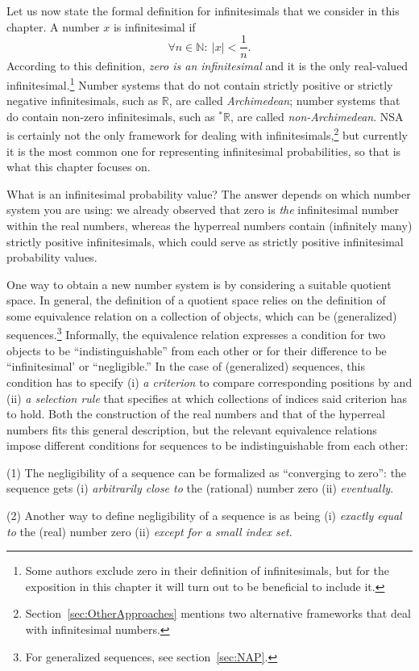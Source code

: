 Let us now state the formal definition for infinitesimals that we consider in this chapter. A number $x$ is infinitesimal if
\begin{equation}
\forall n \in \mathbb{N} : \ |x| < \frac{1}{n}.\label{eq:inf}
\end{equation}
According to this definition, \emph{zero is an infinitesimal} and it is the only real-valued infinitesimal.\footnote{Some authors exclude zero in their definition of infinitesimals, but for the exposition in this chapter it will turn out to be beneficial to include it.}
Number systems that do not contain strictly positive or strictly negative infinitesimals, such as $\mathbb{R}$, are called \emph{Archimedean}; number systems that do contain non-zero infinitesimals, such as ${^*} \mathbb{R}$, are called \emph{non-Archimedean}. NSA is certainly not the only framework for dealing with infinitesimals,\footnote{Section~\ref{sec:OtherApproaches} mentions two alternative frameworks that deal with infinitesimal numbers.} but currently it is the most common one for representing infinitesimal probabilities, so that is what this chapter focuses on.

What is an infinitesimal probability value? The answer depends on which number system you are using: we already observed that zero is \emph{the} infinitesimal number within the real numbers, whereas the hyperreal numbers contain (infinitely many) strictly positive infinitesimals, which could serve as strictly positive infinitesimal probability values.

One way to obtain a new number system is by considering a suitable quotient space. In general, the definition of a quotient space relies on the definition of some equivalence relation on a collection of objects, which can be  (generalized) sequences.\footnote{For generalized sequences, see section~\ref{sec:NAP}.} Informally, the equivalence relation expresses a condition for two objects to be ``indistinguishable'' from each other or for their difference to be ``infinitesimal' or ``negligible.'' In the case of (generalized) sequences, this condition has to specify (i) \textit{a criterion} to compare corresponding positions by and (ii) \textit{a selection rule} that specifies at which collections of indices said criterion has to hold. Both the construction of the real numbers and that of the hyperreal numbers fits this general description, but the relevant equivalence relations impose different conditions for sequences to be indistinguishable from each other:

\begin{description}
  \item{(1)} The negligibility of a sequence can be formalized as ``converging to zero'': the sequence gets (i) \textit{arbitrarily close to} the (rational) number zero (ii) \textit{eventually}.
  \item{(2)} Another way to define negligibility of a sequence is as being (i) \textit{exactly equal to} the (real) number zero (ii) \textit{except for a small index set}.
\end{description}

